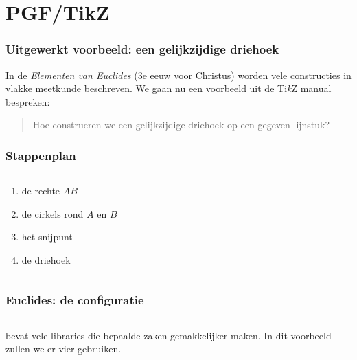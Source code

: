 \section{PGF/TikZ}

\begin{frame}
  \frametitle{Uitgewerkt voorbeeld: een gelijkzijdige driehoek}

  In de \emph{Elementen van Euclides} (3e eeuw voor Christus) worden vele constructies in vlakke meetkunde beschreven. We gaan nu een voorbeeld uit de Ti\textit{k}Z manual bespreken:
  \begin{quote}
    Hoe construeren we een gelijkzijdige driehoek op een gegeven lijnstuk?
  \end{quote}

  \pause
  \centering
  
\end{frame}

\begin{frame}
  \frametitle{Stappenplan}

  \begin{columns}
    \begin{column}{.5\textwidth}
      \begin{enumerate}
        \item de rechte $AB$
        \item de cirkels rond $A$ en $B$
        \item het snijpunt
        \item de driehoek
      \end{enumerate}
    \end{column}
    \begin{column}{.5\textwidth}
      \centering
      
    \end{column}
  \end{columns}
\end{frame}

\begin{frame}
  \frametitle{Euclides: de configuratie}
  
  \inputminted[fontsize = \scriptsize]{latex}{tikz/triangle/configuration.tikz}

  \TikZ bevat vele libraries die bepaalde zaken gemakkelijker maken. In dit voorbeeld zullen we er vier gebruiken.
\end{frame}

